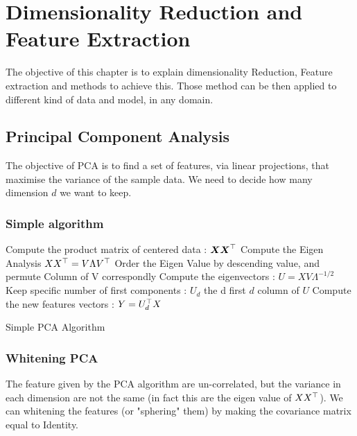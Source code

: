 \chapter{Dimensionality Reduction and Feature Extraction} %
\label{cha:dimensionality_reduction}

The objective of this chapter is to explain dimensionality Reduction, Feature extraction and methods to achieve this. Those method can be then applied to different kind of data and model, in any domain.

\section{Principal Component Analysis} %
	\label{sec:principal_component_analysis}
	
	The objective of PCA is to find a set of features, via linear projections, that maximise the variance of the sample data. We need to decide how many dimension $d$ we want to keep. 
 
	\subsection{Simple algorithm} %
		\label{sub:simple_algorithm}
	
		\begin{algorithm}[H]
				Compute the product matrix of centered data : ${\boldsymbol{{X}}} {\boldsymbol{{X}}} ^\top$\;
				Compute the Eigen Analysis $X X^\top = V \Lambda V ^\top$ \;
				Order the Eigen Value by descending value, and permute Column of V correspondly\; 
				Compute the eigenvectors : $U = X V \Lambda^{-1/2}$\;
				Keep specific number of first components : $U_d$ the d first $d$ column of $U$ \;
				Compute the new features vectors : $Y = U_d^\top X$ 
				\caption{Simple PCA Algorithm}
			\end{algorithm}

	\subsection{Whitening PCA} %
		\label{sub:whitening_pca}

		The feature given by the PCA algorithm are un-correlated, but the variance in each dimension are not the same (in fact this are the eigen value of $X X^\top$). We can whitening the features (or "sphering" them) by making the covariance matrix equal to Identity.

